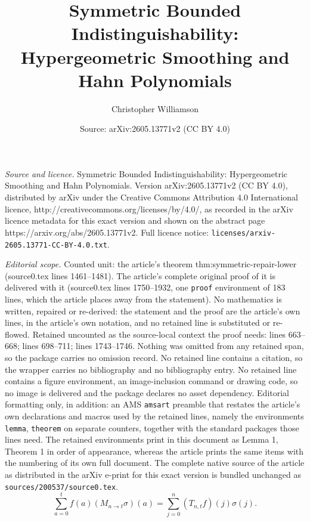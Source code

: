 \documentclass[10pt,a4paper]{amsart}
\title{Symmetric Bounded Indistinguishability: Hypergeometric Smoothing and Hahn Polynomials}
\author{Christopher Williamson}
\date{Source: arXiv:2605.13771v2 (CC BY 4.0)}
\begin{document}
\maketitle

\noindent\emph{Source and licence.} Symmetric Bounded Indistinguishability: Hypergeometric Smoothing and Hahn Polynomials. Version arXiv:2605.13771v2 (CC BY 4.0), distributed by arXiv under the Creative Commons Attribution 4.0 International licence, http://creativecommons.org/licenses/by/4.0/, as recorded in the arXiv licence metadata for this exact version and shown on the abstract page https://arxiv.org/abs/2605.13771v2. Full licence notice: \texttt{licenses/arxiv-2605.13771-CC-BY-4.0.txt}.\par\smallskip

\noindent\textit{Editorial scope.} Counted unit: the article's theorem thm:symmetric-repair-lower (source0.tex lines 1461--1481). The article's complete original proof of it is delivered with it (source0.tex lines 1750--1932, one \texttt{proof} environment of 183 lines, which the article places away from the statement). No mathematics is written, repaired or re-derived: the statement and the proof are the article's own lines, in the article's own notation, and no retained line is substituted or re-flowed.  Retained uncounted as the source-local context the proof needs: lines 663--668; lines 698--711; lines 1743--1746.  Nothing was omitted from any retained span, so the package carries no omission record.  No retained line contains a citation, so the wrapper carries no bibliography and no bibliography entry.  No retained line contains a figure environment, an image-inclusion command or drawing code, so no image is delivered and the package declares no asset dependency.  Editorial formatting only, in addition: an AMS \texttt{amsart} preamble that restates the article's own declarations and macros used by the retained lines, namely the environments \texttt{lemma}, \texttt{theorem} on separate counters, together with the standard packages those lines need.  The retained environments print in this document as Lemma 1, Theorem 1 in order of appearance, whereas the article prints the same items with the numbering of its own full document.  The complete native source of the article as distributed in the arXiv e-print for this exact version is bundled unchanged as \texttt{sources/200537/source0.tex}.
\begin{equation}
\label{eq:T-M-adjoint-measures}
    \sum_{a=0}^t f(a)(M_{n\to t}\sigma)(a)
    =
    \sum_{j=0}^n (T_{n,t}f)(j)\sigma(j).
\end{equation}
\end{document}

